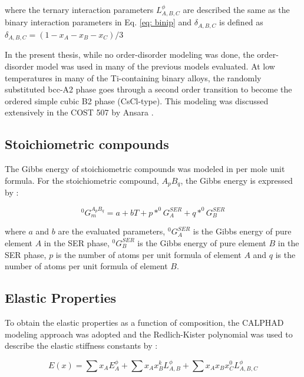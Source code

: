 \noindent where the ternary interaction parameters $L_{A, B, C}^{\phi}$ are described the same as the binary interaction parameters in Eq. \ref{eq: binip} and $\delta_{A, B, C}$ is defined as $\delta_{A, B, C} = ( 1 - x_{A} - x_{B} - x_{C})/3$

In the present thesis, while no order-disorder modeling was done, the order-disorder model was used in many of the previous models evaluated. At low temperatures in many of the Ti-containing binary alloys, the randomly substituted bcc-A2 phase goes through a second order transition to become the ordered simple cubic B2 phase (CsCl-type). This modeling was discussed extensively in the COST 507 by Ansara \cite{Ansara1998}. 

\subsection{Stoichiometric compounds}

The Gibbs energy of stoichiometric compounds was modeled in per mole unit formula. For the stoichiometric compound, $A_{p}B_{q}$, the Gibbs energy is expressed by \cite{Zacherl2012}: 

\begin{equation}
\label{eq: stoichiometric}
^{0}G_{m}^{A_{p}B_{q}} = a + bT + p * ^{0}G_{A}^{SER} + q * ^{0}G_{B}^{SER}
\end{equation}

\noindent where $a$ and $b$ are the evaluated parameters, $^{0}G_{A}^{SER}$ is the Gibbs energy of pure element $A$ in the SER phase, $^{0}G_{B}^{SER}$ is the Gibbs energy of pure element $B$ in the SER phase, $p$ is the number of atoms per unit formula of element $A$ and $q$ is the number of atoms per unit formula of element $B$.

\subsection{Elastic Properties}

To obtain the elastic properties as a function of composition, the CALPHAD modeling approach was adopted and the Redlich-Kister polynomial was used to describe the elastic stiffness constants by \cite{Redlich1948b,Shang2010c}: 

\begin{equation}
\label{eq: elastic}
E(x) = \sum x_{A} E_{A}^{\phi} + \sum x_{A} x_{B} ^{k}L_{A,B}^{\phi} + \sum x_{A} x_{B} x_{C} ^{0}L_{A, B, C}^{\phi}
\end{equation}

